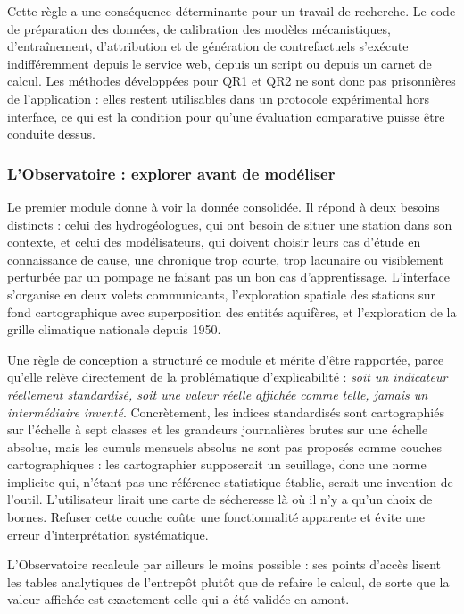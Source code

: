Cette règle a une conséquence déterminante pour un travail de recherche. Le code de préparation des données, de calibration des modèles mécanistiques, d'entraînement, d'attribution et de génération de contrefactuels s'exécute indifféremment depuis le service web, depuis un script ou depuis un carnet de calcul. Les méthodes développées pour QR1 et QR2 ne sont donc pas prisonnières de l'application : elles restent utilisables dans un protocole expérimental hors interface, ce qui est la condition pour qu'une évaluation comparative puisse être conduite dessus.

\subsubsection{L'Observatoire : explorer avant de modéliser}

Le premier module donne à voir la donnée consolidée. Il répond à deux besoins distincts : celui des hydrogéologues, qui ont besoin de situer une station dans son contexte, et celui des modélisateurs, qui doivent choisir leurs cas d'étude en connaissance de cause, une chronique trop courte, trop lacunaire ou visiblement perturbée par un pompage ne faisant pas un bon cas d'apprentissage. L'interface s'organise en deux volets communicants, l'exploration spatiale des stations sur fond cartographique avec superposition des entités aquifères, et l'exploration de la grille climatique nationale depuis 1950.

Une règle de conception a structuré ce module et mérite d'être rapportée, parce qu'elle relève directement de la problématique d'explicabilité : \emph{soit un indicateur réellement standardisé, soit une valeur réelle affichée comme telle, jamais un intermédiaire inventé}. Concrètement, les indices standardisés sont cartographiés sur l'échelle à sept classes et les grandeurs journalières brutes sur une échelle absolue, mais les cumuls mensuels absolus ne sont pas proposés comme couches cartographiques : les cartographier supposerait un seuillage, donc une norme implicite qui, n'étant pas une référence statistique établie, serait une invention de l'outil. L'utilisateur lirait une carte de sécheresse là où il n'y a qu'un choix de bornes. Refuser cette couche coûte une fonctionnalité apparente et évite une erreur d'interprétation systématique.

L'Observatoire recalcule par ailleurs le moins possible : ses points d'accès lisent les tables analytiques de l'entrepôt plutôt que de refaire le calcul, de sorte que la valeur affichée est exactement celle qui a été validée en amont.

